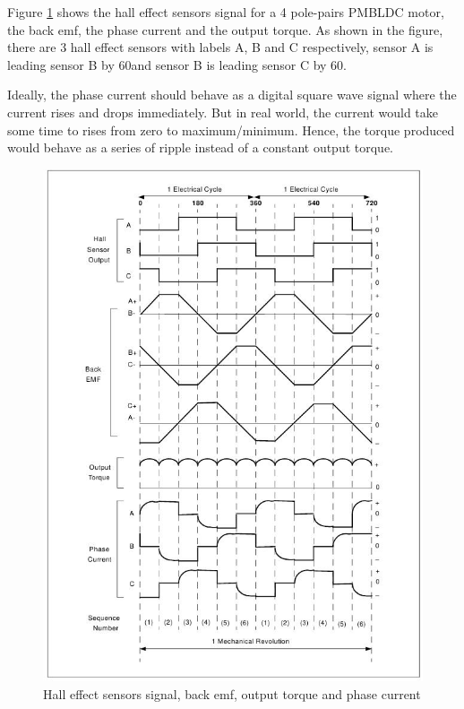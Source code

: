 Figure \ref{im:signals} shows the hall effect sensors signal for a 4 pole-pairs PMBLDC motor, the back emf, the phase current and the output torque. As shown in the figure, there are 3 hall effect sensors with labels A, B and C respectively, sensor A is leading sensor B by 60\textdegree and sensor B is leading sensor C by 60\textdegree. 


Ideally, the phase current should behave as a digital square wave signal where the current rises and drops immediately. But in real world, the current would take some time to rises from zero to maximum/minimum. Hence, the torque produced would behave as a series of ripple instead of a constant output torque.

\begin{figure}
	\centering
	\includegraphics[width=5.5in]{images/signal.jpg}
	\caption{Hall effect sensors signal, back emf, output torque and phase current \citep{an885}}
	\label{im:signals}
\end{figure}


